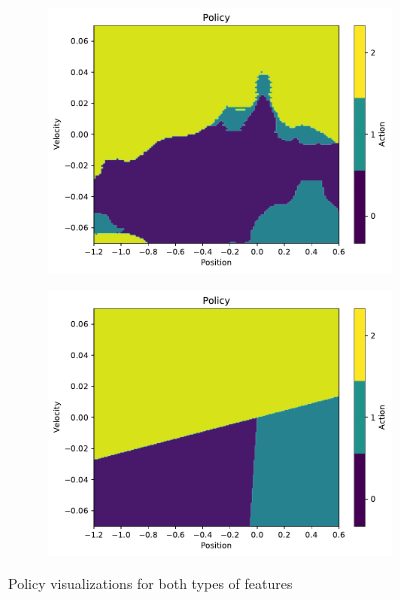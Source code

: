 \begin{figure}[H]
    \centering
    \begin{subfigure}{0.5\textwidth}
        \includegraphics[width=\linewidth]{figs/policy_A.pdf}
        \caption{}
        \label{fig:policy_a}
    \end{subfigure}%
    \begin{subfigure}{0.5\textwidth}
        \includegraphics[width=\linewidth]{figs/policy_B.pdf}
        \caption{}
        \label{fig:policy_b}
    \end{subfigure}
    \caption{Policy visualizations for both types of features}
    \label{fig:policy}
\end{figure}


